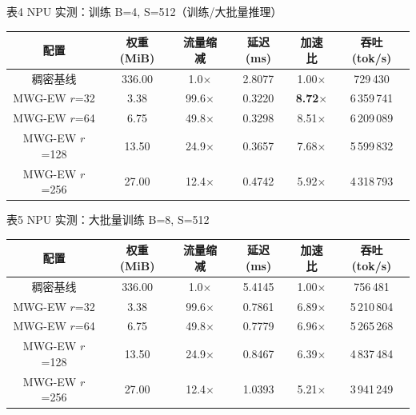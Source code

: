 \documentclass[UTF8,a4paper,12pt]{ctexart}
\newcommand{\cmtablecaption}[1]{%
  {\centering\fangsong\fontsize{10.5pt}{16pt}\selectfont #1\par}%
}
\begin{document}
\begin{center}
\cmtablecaption{表4 NPU 实测：训练 B=4, S=512（训练/大批量推理）}
\vspace{4pt}
\small
\begin{tabular}{cccccc}
\hline
配置 & 权重 (MiB) & 流量缩减 & 延迟 (ms) & 加速比 & 吞吐 (tok/s) \\
\hline
稠密基线    & 336.00 & 1.0$\times$      & 2.8077 & 1.00$\times$ & 729\,430 \\
MWG-EW $r$=32  & 3.38   & 99.6$\times$ & 0.3220 & \textbf{8.72$\times$} & 6\,359\,741 \\
MWG-EW $r$=64  & 6.75   & 49.8$\times$ & 0.3298 & 8.51$\times$ & 6\,209\,089 \\
MWG-EW $r$=128 & 13.50  & 24.9$\times$ & 0.3657 & 7.68$\times$ & 5\,599\,832 \\
MWG-EW $r$=256 & 27.00  & 12.4$\times$ & 0.4742 & 5.92$\times$ & 4\,318\,793 \\
\hline
\end{tabular}
\normalsize
\end{center}

\begin{center}
\cmtablecaption{表5 NPU 实测：大批量训练 B=8, S=512}
\vspace{4pt}
\small
\begin{tabular}{cccccc}
\hline
配置 & 权重 (MiB) & 流量缩减 & 延迟 (ms) & 加速比 & 吞吐 (tok/s) \\
\hline
稠密基线    & 336.00 & 1.0$\times$      & 5.4145 & 1.00$\times$ & 756\,481 \\
MWG-EW $r$=32  & 3.38   & 99.6$\times$ & 0.7861 & 6.89$\times$ & 5\,210\,804 \\
MWG-EW $r$=64  & 6.75   & 49.8$\times$ & 0.7779 & 6.96$\times$ & 5\,265\,268 \\
MWG-EW $r$=128 & 13.50  & 24.9$\times$ & 0.8467 & 6.39$\times$ & 4\,837\,484 \\
MWG-EW $r$=256 & 27.00  & 12.4$\times$ & 1.0393 & 5.21$\times$ & 3\,941\,249 \\
\hline
\end{tabular}
\normalsize
\end{center}

\end{document}
